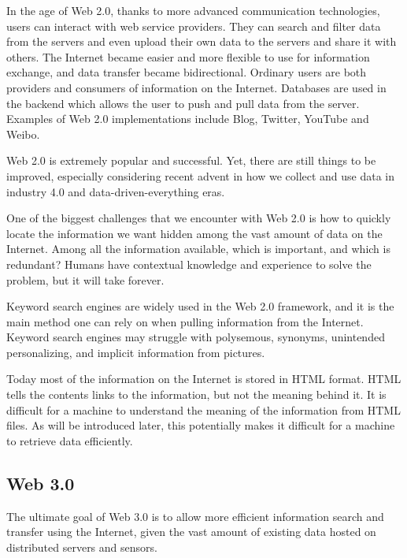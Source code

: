 In the age of Web 2.0, thanks to more advanced communication technologies, users can interact with web service providers. They can search and filter data from the servers and even upload their own data to the servers and share it with others. The Internet became easier and more flexible to use for information exchange, and data transfer became bidirectional. Ordinary users are both providers and consumers of information on the Internet. Databases are used in the backend which allows the user to push and pull data from the server. Examples of Web 2.0 implementations include Blog, Twitter, YouTube and Weibo.

Web 2.0 is extremely popular and successful. Yet, there are still things to be improved, especially considering recent advent in how we collect and use data in industry 4.0 and data-driven-everything eras.

One of the biggest challenges that we encounter with Web 2.0 is how to quickly locate the information we want hidden among the vast amount of data on the Internet. Among all the information available, which is important, and which is redundant? Humans have contextual knowledge and experience to solve the problem, but it will take forever.

Keyword search engines are widely used in the Web 2.0 framework, and it is the main method one can rely on when pulling information from the Internet. Keyword search engines may struggle with polysemous, synonyms, unintended personalizing, and implicit information from pictures.

Today most of the information on the Internet is stored in HTML format. HTML tells the contents links to the information, but not the meaning behind it. It is difficult for a machine to understand the meaning of the information from HTML files. As will be introduced later, this potentially makes it difficult for a machine to retrieve data efficiently.

\subsection{Web 3.0}

The ultimate goal of Web 3.0 is to allow more efficient information search and transfer using the Internet, given the vast amount of existing data hosted on distributed servers and sensors.

